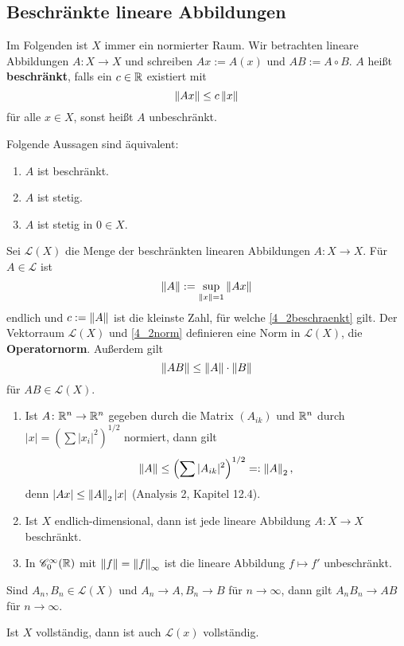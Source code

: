 \subsection{Beschränkte lineare Abbildungen}
Im Folgenden ist $X$ immer ein normierter Raum. Wir betrachten lineare Abbildungen $A \colon X \to X$ und schreiben $Ax := A(x)$ und $AB := A \circ B$. $A$ heißt \textbf{beschränkt}, falls ein $c \in \mathbb{R}$ existiert mit
\begin{equation}
	\left\lVert Ax\right\rVert \leq c \left\lVert x\right\rVert\label{4_2beschraenkt}
\end{equation}
für alle $x \in X$, sonst heißt $A$ unbeschränkt.
\begin{satz}\label{satz4_7}
	Folgende Aussagen sind äquivalent:
	\begin{enumerate}[label=(\alph*)]
		\item $A$ ist beschränkt.
		\item $A$ ist stetig.
		\item $A$ ist stetig in $0\in X$.
	\end{enumerate}
\end{satz}
Sei $\mathscr{L}(X)$ die Menge der beschränkten linearen Abbildungen $A \colon X \to X$. Für $A \in \mathscr{L}$ ist
\begin{equation}\label{4_2norm}
	\left\lVert A\right\rVert := \sup_{\left\lVert x\right\rVert = 1} \left\lVert Ax\right\rVert
\end{equation}
endlich und $c := \left\lVert A\right\rVert$ ist die kleinste Zahl, für welche \eqref{4_2beschraenkt} gilt. Der Vektorraum $\mathscr{L}(X)$ und \eqref{4_2norm} definieren eine Norm in $\mathscr{L}(X)$, die \textbf{Operatornorm}.
Außerdem gilt
\begin{equation}\label{4_2ungleichung}
	\left\lVert AB\right\rVert \leq \left\lVert A\right\rVert\cdot\left\lVert B\right\rVert
\end{equation}
für $AB \in \mathscr{L}(X)$.
\begin{rem}
	\begin{enumerate}[label=(\arabic*)]
		\item Ist $A \colon \mathbb{R}^n \to \mathbb{R}^n$ gegeben durch die Matrix $(A_{ik})$ und $\mathbb{R}^n$ durch $|x| = \left(\sum |x_i|^2\right)^{1/2}$ normiert, dann gilt
		\[\left\lVert A\right\rVert \leq \left(\sum |A_{ik}|^2\right)^{1/2} =: \left\lVert A\right\rVert_2,\]
		denn $|Ax| \leq \left\lVert A\right\rVert_2 |x|$ (Analysis 2, Kapitel 12.4).
		\item Ist $X$ endlich-dimensional, dann ist jede lineare Abbildung $A \colon X \to X$ beschränkt.
		\item In $\mathscr{C}_0^\infty(\mathbb{R})$ mit $\left\lVert f\right\rVert = {\left\lVert f\right\rVert}_\infty$ ist die lineare Abbildung $f \mapsto f'$ unbeschränkt.
	\end{enumerate}
\end{rem}
\begin{satz}\label{satz4_8}
	Sind $A_n, B_n \in \mathscr{L}(X)$ und $A_n \to A, B_n \to B$ für $n \to \infty$, dann gilt $A_n B_n \to AB$ für $n \to \infty$.
\end{satz}
\begin{thm}\label{thm4_9}
	Ist $X$ vollständig, dann ist auch $\mathscr{L}(x)$ vollständig.
\end{thm}
